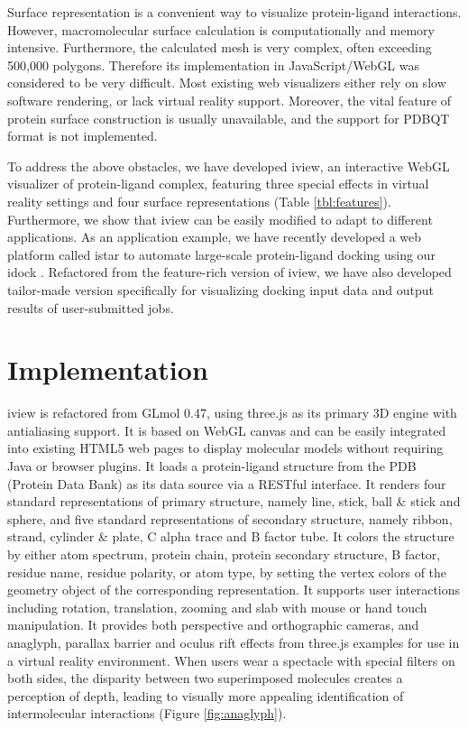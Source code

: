 \documentclass[twocolumn]{bmcart}%
\begin{document}
Surface representation is a convenient way to visualize protein-ligand interactions. However, macromolecular surface calculation is computationally and memory intensive. Furthermore, the calculated mesh is very complex, often exceeding 500,000 polygons. Therefore its implementation in JavaScript/WebGL was considered to be very difficult. Most existing web visualizers either rely on slow software rendering, or lack virtual reality support. Moreover, the vital feature of protein surface construction is usually unavailable, and the support for PDBQT format is not implemented.

To address the above obstacles, we have developed iview, an interactive WebGL visualizer of protein-ligand complex, featuring three special effects in virtual reality settings and four surface representations (Table \ref{tbl:features}). Furthermore, we show that iview can be easily modified to adapt to different applications. As an application example, we have recently developed a web platform called istar to automate large-scale protein-ligand docking using our idock \cite{1153}. Refactored from the feature-rich version of iview, we have also developed tailor-made version specifically for visualizing docking input data and output results of user-submitted jobs.

\section*{Implementation}
iview is refactored from GLmol 0.47, using three.js as its primary 3D engine with antialiasing support. It is based on WebGL canvas and can be easily integrated into existing HTML5 web pages to display molecular models without requiring Java or browser plugins. It loads a protein-ligand structure from the PDB (Protein Data Bank) \cite{537} as its data source via a RESTful interface. It renders four standard representations of primary structure, namely line, stick, ball \& stick and sphere, and five standard representations of secondary structure, namely ribbon, strand, cylinder \& plate, C alpha trace and B factor tube. It colors the structure by either atom spectrum, protein chain, protein secondary structure, B factor, residue name, residue polarity, or atom type, by setting the vertex colors of the geometry object of the corresponding representation. It supports user interactions including rotation, translation, zooming and slab with mouse or hand touch manipulation. It provides both perspective and orthographic cameras, and anaglyph, parallax barrier and oculus rift effects from three.js examples for use in a virtual reality environment. When users wear a spectacle with special filters on both sides, the disparity between two superimposed molecules creates a perception of depth, leading to visually more appealing identification of intermolecular interactions (Figure \ref{fig:anaglyph}).
\end{document}
